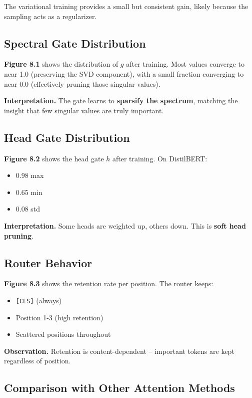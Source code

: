 The variational training provides a small but consistent gain, likely 
because the sampling acts as a regularizer.

\subsection{Spectral Gate Distribution}

\textbf{Figure 8.1} shows the distribution of $g$ after training. Most values 
converge to near 1.0 (preserving the SVD component), with a small fraction 
converging to near 0.0 (effectively pruning those singular values).

\textbf{Interpretation.} The gate learns to \textbf{sparsify the spectrum}, matching 
the insight that few singular values are truly important.

\subsection{Head Gate Distribution}

\textbf{Figure 8.2} shows the head gate $h$ after training. On DistilBERT:
\begin{itemize}
\item 0.98 max
\item 0.65 min
\item 0.08 std

\end{itemize}
\textbf{Interpretation.} Some heads are weighted up, others down. This is 
\textbf{soft head pruning}.

\subsection{Router Behavior}

\textbf{Figure 8.3} shows the retention rate per position. The router keeps:
\begin{itemize}
\item \texttt{[CLS]} (always)
\item Position 1-3 (high retention)
\item Scattered positions throughout

\end{itemize}
\textbf{Observation.} Retention is content-dependent -- important tokens are 
kept regardless of position.

\subsection{Comparison with Other Attention Methods}

